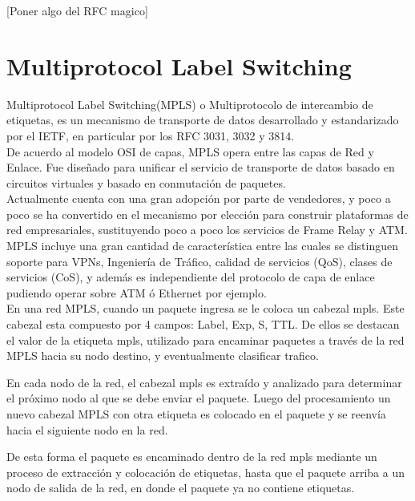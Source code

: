[Poner algo del RFC magico]

\section{Multiprotocol Label Switching}
\label{section2.8}

Multiprotocol Label Switching(MPLS) o Multiprotocolo de intercambio de etiquetas, es un mecanismo de transporte de datos desarrollado y estandarizado por el IETF, en particular por los RFC 3031\cite{rosen2001multiprotocol}, 3032\citep{rosen2001mpls} y 3814\citep{nadeau2004multiprotocol}.\\

De acuerdo al modelo OSI de capas, MPLS opera entre las capas de Red y Enlace. Fue diseñado para unificar el servicio de transporte de datos basado en circuitos virtuales y basado en conmutación de paquetes.\\

Actualmente cuenta con una gran adopción por parte de vendedores, y poco a poco se ha convertido en el mecanismo por elección para construir plataformas de red empresariales, sustituyendo poco a poco los servicios de Frame Relay y ATM.\\
 
MPLS incluye una gran cantidad de característica entre las cuales se distinguen soporte para VPNs, Ingeniería de Tráfico, calidad de servicios (QoS), clases de servicios (CoS), y además es independiente del protocolo de capa de enlace pudiendo operar sobre ATM ó Ethernet por ejemplo.\\

En una red MPLS, cuando un paquete ingresa se le coloca un cabezal mpls. Este cabezal esta compuesto por 4 campos: Label, Exp, S, TTL. De ellos se destacan el valor de la etiqueta mpls, utilizado para encaminar paquetes a través de la red MPLS hacia su nodo destino, y eventualmente clasificar trafico.

En cada nodo de la red, el cabezal mpls es extraído y analizado para determinar el próximo nodo al que se debe enviar el paquete. Luego del procesamiento un nuevo cabezal MPLS con otra etiqueta es colocado en el paquete y se reenvía hacia el siguiente nodo en la red.

De esta forma el paquete es encaminado dentro de la red mpls mediante un proceso de extracción y colocación de etiquetas, hasta que el paquete arriba a un nodo de salida de la red, en donde el paquete ya no contiene etiquetas.\\

